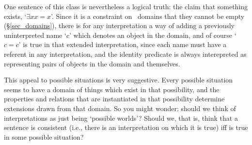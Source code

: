 One sentence of this class is nevertheless a logical truth: the claim that something exists, `$\exists x x=x$'. Since it is a constraint on \FOL\ domains that they cannot be empty (§\ref{sec_domains}), there is for any interpretation a way of adding a previously uninterpreted name `$c$' which denotes an object in the domain, and of course `$c=c$' is true in that extended interpretation, since each name must have a referent in any interpretation, and the identity predicate is always interepreted as representing pairs of objects in the domain and themselves.

This appeal to possible situations is very suggestive. Every possible situation seems to have a domain of things which exist in that possibility, and the properties and relations that are instantiated in that possibility determine extensions drawn from that domain. So you might wonder: should we think of interpretations as just being `possible worlds'? Should we, that is, think that a sentence  is consistent (i.e., there is an interpretation on which it is true) iff  is true in some possible situation?

